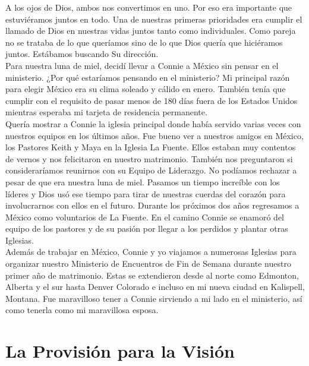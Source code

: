 \documentclass[twoside, 12pt]{book}
\begin{document}
A los ojos de Dios, ambos nos convertimos en uno. Por eso era importante que estuviéramos juntos en todo. Una de nuestras primeras prioridades era cumplir el llamado de Dios en nuestras vidas juntos tanto como individuales. Como pareja no se trataba de lo que queríamos sino de lo que Dios quería que hiciéramos juntos. Estábamos buscando Su dirección.\\

Para nuestra luna de miel, decidí llevar a Connie a México sin pensar en el ministerio.  ¿Por qué estaríamos pensando en el ministerio? Mi principal razón para elegir México era su clima soleado y cálido en enero. También tenía que cumplir con el requisito de pasar menos de 180 días fuera de los Estados Unidos mientras esperaba mi tarjeta de residencia permanente.\\

Quería mostrar a Connie la iglesia principal donde había servido varias veces con nuestros equipos en los últimos años. Fue bueno ver a nuestros amigos en México, los Pastores Keith y Maya en la Iglesia La Fuente. Ellos estaban muy contentos de vernos y nos felicitaron en nuestro matrimonio. También nos preguntaron si consideraríamos reunirnos con su Equipo de Liderazgo. No podíamos rechazar a pesar de que era nuestra luna de miel. Pasamos un tiempo increíble con los líderes y Dios usó ese tiempo para tirar de nuestras cuerdas del corazón para involucrarnos con ellos en el futuro. Durante los próximos dos años regresamos a México como voluntarios de La Fuente. En el camino Connie se enamoró del equipo de los pastores y de su pasión por llegar a los perdidos y plantar otras Iglesias.\\

Además de trabajar en México, Connie y yo viajamos a numerosas Iglesias para organizar nuestro Ministerio de Encuentros de Fin de Semana durante nuestro primer año de matrimonio. Estas se extendieron desde al norte como Edmonton, Alberta y el sur hasta Denver Colorado e incluso en mi nueva ciudad en Kalispell, Montana.  Fue maravilloso tener a Connie sirviendo a mi lado en el ministerio, así como tenerla como mi maravillosa esposa.\\
 
\section{La Provisión para la Visión}
\end{document}
